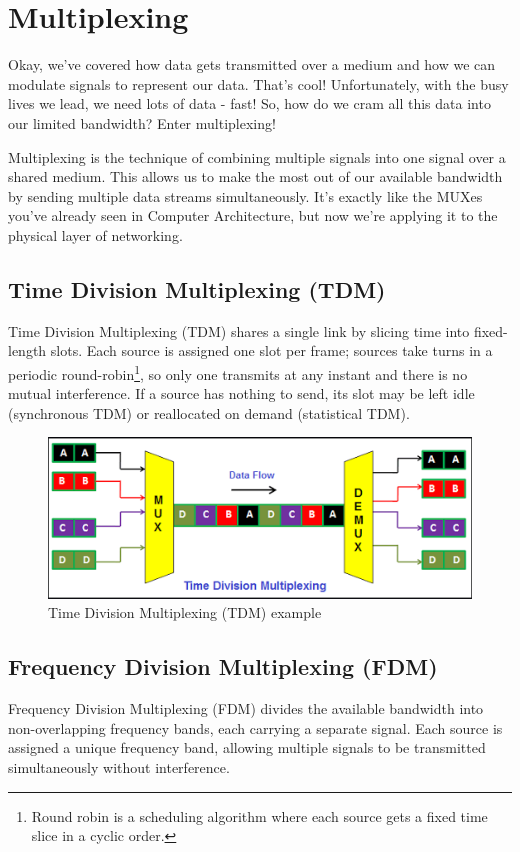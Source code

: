 \newpage
\section{Multiplexing}\label{sec:multiplexing}
Okay, we've covered how data gets transmitted over a medium and how we can modulate signals to represent our data. That's cool! Unfortunately, with the busy lives we lead, we need lots of data - fast! So, how do we cram all this data into our limited bandwidth? Enter multiplexing!

Multiplexing is the technique of combining multiple signals into one signal over a shared medium. This allows us to make the most out of our available bandwidth by sending multiple data streams simultaneously. It's exactly like the MUXes you've already seen in Computer Architecture, but now we're applying it to the physical layer of networking.

\subsection{Time Division Multiplexing (TDM)}
\label{subsec:tdm}
Time Division Multiplexing (TDM) shares a single link by slicing time into fixed-length slots. Each source is assigned one slot per frame; sources take turns in a periodic round-robin\footnote{
    Round robin is a scheduling algorithm where each source gets a fixed time slice in a cyclic order. 
}, so only one transmits at any instant and there is no mutual interference. If a source has nothing to send, its slot may be left idle (synchronous TDM) or reallocated on demand (statistical TDM).

\begin{figure}[h]
    \centering
    \includegraphics[width=.8\textwidth]{assets/osi/physical/multiplexing/tdm.png}
    \caption{Time Division Multiplexing (TDM) example}
    \label{fig:tdm_example}
\end{figure}

\subsection{Frequency Division Multiplexing (FDM)}
\label{subsec:fdm}
Frequency Division Multiplexing (FDM) divides the available bandwidth into non-overlapping frequency bands, each carrying a separate signal. Each source is assigned a unique frequency band, allowing multiple signals to be transmitted simultaneously without interference.

